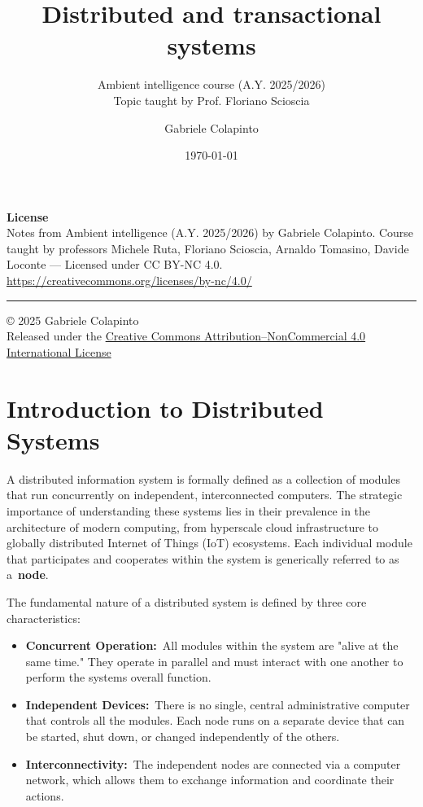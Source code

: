 \documentclass{scrbook}
\title{Distributed and transactional systems}
\subtitle{Ambient intelligence course (A.Y. 2025/2026)\\Topic taught by Prof. Floriano Scioscia}
\author{Gabriele Colapinto}
\date{\today}
\begin{document}
\maketitle
\thispagestyle{empty}

{\Large\textbf{License}} \\
{Notes from Ambient intelligence (A.Y. 2025/2026) by Gabriele Colapinto. 
Course taught by professors Michele Ruta, Floriano Scioscia, Arnaldo Tomasino, Davide Loconte — 
Licensed under CC BY-NC 4.0.\\
\url{https://creativecommons.org/licenses/by-nc/4.0/}}

\vspace*{\fill}
\rule{\textwidth}{0.2pt}
\small{© 2025 Gabriele Colapinto \\
Released under the \href{https://creativecommons.org/licenses/by-nc/4.0/}{Creative Commons Attribution–NonCommercial 4.0 International License}}

\clearpage

\tableofcontents

\chapter{Introduction to Distributed Systems}


A distributed information system is formally defined as a collection of
modules that run concurrently on independent, interconnected computers.
The strategic importance of understanding these systems lies in their
prevalence in the architecture of modern computing, from hyperscale
cloud infrastructure to globally distributed Internet of Things (IoT)
ecosystems. Each individual module that participates and cooperates
within the system is generically referred to as a~\textbf{node}.

The fundamental nature of a distributed system is defined by three core
characteristics:

\begin{itemize}
\item
  \textbf{Concurrent Operation:}~All modules within the system are
  "alive at the same time." They operate in parallel and must interact
  with one another to perform the system\textquotesingle s overall
  function.
\item
  \textbf{Independent Devices:}~There is no single, central
  administrative computer that controls all the modules. Each node runs
  on a separate device that can be started, shut down, or changed
  independently of the others.
\item
  \textbf{Interconnectivity:}~The independent nodes are connected via a
  computer network, which allows them to exchange information and
  coordinate their actions.
\end{itemize}
\end{document}
